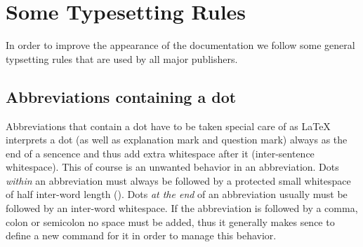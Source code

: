 %
%
% 
% 
% 
% 
% 
% 
% 
% 
%

\section{Some Typesetting Rules}
\label{sec:typesetting}

In order to improve the appearance of the documentation we follow some general typsetting rules that are used by all major publishers.

\subsection{Abbreviations containing a dot}
\label{subsec:abbreviationsWithDot}
Abbreviations that contain a dot have to be taken special care of as \LaTeX{} interprets a dot (as well as explanation mark and question mark) always as the end of a sencence and thus add extra whitespace after it (inter-sentence whitespace). This of course is an unwanted behavior in an abbreviation. Dots {\em within} an abbreviation must always be followed by a protected small whitespace of half inter-word length (\code{\textbackslash ,}). Dots {\em at the end} of an abbreviation usually must be followed by an inter-word whitespace. If the abbreviation is followed by a comma, colon or semicolon no space must be added, thus it generally makes sence to define a new command for it in order to manage this behavior.

